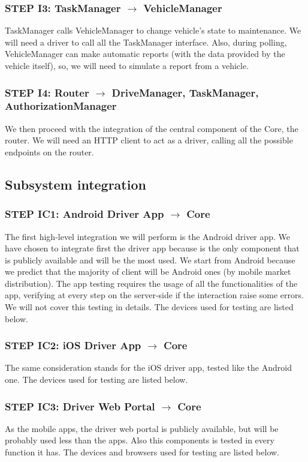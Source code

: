 \subsubsection{STEP I3: TaskManager $\rightarrow$ VehicleManager}
TaskManager calls VehicleManager to change vehicle's state to maintenance. We will need a driver to call all the TaskManager interface. Also, during polling, VehicleManager can make automatic reports (with the data provided by the vehicle itself), so, we will need to simulate a report from a vehicle.

\subsubsection{STEP I4: Router $\rightarrow$ DriveManager, TaskManager, AuthorizationManager}
We then proceed with the integration of the central component of the Core, the router. We will need an HTTP client to act as a driver, calling all the possible endpoints on the router. 

\subsection{Subsystem integration}
\subsubsection{STEP IC1: Android Driver App $\rightarrow$ Core}
The first high-level integration we will perform is the Android driver app. We have chosen to integrate first the driver app because is the only component that is publicly available and will be the most used. We start from Android because we predict that the majority of client will be Android ones (by mobile market distribution). The app testing requires the usage of all the functionalities of the app, verifying at every step on the server-side if the interaction raise some errors. We will not cover this testing in details. The devices used for testing are listed below.

\subsubsection{STEP IC2: iOS Driver App $\rightarrow$ Core}
The same consideration stands for the iOS driver app, tested like the Android one. The devices used for testing are listed below.

\subsubsection{STEP IC3: Driver Web Portal $\rightarrow$ Core}
As the mobile apps, the driver web portal is publicly available, but will be probably used less than the apps. Also this components is tested in every function it has. The devices and browsers used for testing are listed below.

